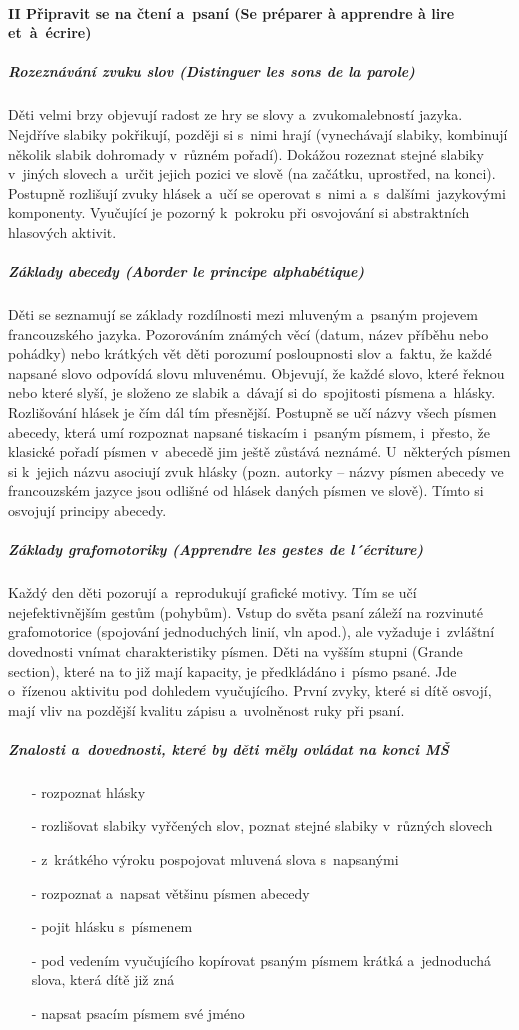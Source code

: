 			\paragraph*{II Připravit se na čtení a~psaní (Se préparer à apprendre à lire et~à~écrire)}
				\subparagraph{Rozeznávání zvuku slov (Distinguer les sons de la parole)}
					Děti velmi brzy objevují radost ze hry se slovy a~zvukomalebností jazyka. Nejdříve slabiky pokřikují, později si s nimi hrají (vynechávají slabiky, kombinují několik slabik dohromady v různém pořadí). Dokážou rozeznat stejné slabiky v jiných slovech a~určit jejich pozici ve slově (na začátku, uprostřed, na konci).
					Postupně rozlišují zvuky hlásek a~učí se operovat s nimi a~s~dalšími jazykovými komponenty. Vyučující je pozorný k pokroku při osvojování si abstraktních hlasových aktivit.
				\subparagraph{Základy abecedy (Aborder le principe alphabétique)}
					Děti se seznamují se základy rozdílnosti mezi mluveným a~psaným projevem francouzského jazyka. Pozorováním známých věcí (datum, název příběhu nebo pohádky) nebo krátkých vět děti porozumí posloupnosti slov a~faktu, že každé napsané slovo odpovídá slovu mluvenému. 
					Objevují, že každé slovo, které řeknou nebo které slyší, je složeno ze slabik a~dávají si do spojitosti písmena a~hlásky. Rozlišování hlásek je čím dál tím přesnější. Postupně se učí názvy všech písmen abecedy, která umí rozpoznat napsané tiskacím i~psaným písmem, i~přesto, že klasické pořadí písmen v abecedě jim ještě zůstává neznámé. U~některých písmen si k~jejich názvu asociují zvuk hlásky (pozn. autorky – názvy písmen abecedy ve francouzském jazyce jsou odlišné od hlásek daných písmen ve slově). Tímto si osvojují principy abecedy.
				\subparagraph{Základy grafomotoriky (Apprendre les gestes de l´écriture)} 
					Každý den děti pozorují a~reprodukují grafické motivy. Tím se učí nejefektivnějším gestům (pohybům). Vstup do světa psaní záleží na rozvinuté grafomotorice (spojování jednoduchých linií, vln apod.), ale vyžaduje i~zvláštní dovednosti vnímat charakteristiky písmen. 
					Děti na vyšším stupni (Grande section), které na to již mají kapacity, je předkládáno i písmo psané. Jde o~řízenou aktivitu pod dohledem vyučujícího. První zvyky, které si dítě osvojí, mají vliv na pozdější kvalitu zápisu a~uvolněnost ruky při psaní. 
					
					\subparagraph{Znalosti a~dovednosti, které by děti měly ovládat na konci MŠ}
					\begin{itemize}
						\setlength\itemsep{-2mm}
						\item[-] rozpoznat hlásky
						\item[-] rozlišovat slabiky vyřčených slov, poznat stejné slabiky v různých slovech
						\item[-] z krátkého výroku pospojovat mluvená slova s napsanými
						\item[-] rozpoznat a~napsat většinu písmen abecedy
						\item[-] pojit hlásku s písmenem
						\item[-] pod vedením vyučujícího kopírovat psaným písmem krátká a~jednoduchá slova, která dítě již zná
						\item[-] napsat psacím písmem své jméno
					\end{itemize}


